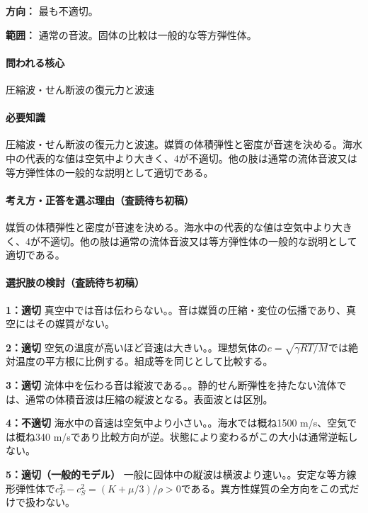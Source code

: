 \noindent\textbf{方向：} 最も不適切。\par

\noindent\textbf{範囲：} 通常の音波。固体の比較は一般的な等方弾性体。\par

\paragraph{問われる核心} 圧縮波・せん断波の復元力と波速

\paragraph{必要知識} 圧縮波・せん断波の復元力と波速。媒質の体積弾性と密度が音速を決める。海水中の代表的な値は空気中より大きく、4が不適切。他の肢は通常の流体音波又は等方弾性体の一般的な説明として適切である。

\paragraph{考え方・正答を選ぶ理由（査読待ち初稿）} 媒質の体積弾性と密度が音速を決める。海水中の代表的な値は空気中より大きく、4が不適切。他の肢は通常の流体音波又は等方弾性体の一般的な説明として適切である。

\paragraph{選択肢の検討（査読待ち初稿）}\mbox{}\par

\noindent\textbf{1：適切} 真空中では音は伝わらない。。音は媒質の圧縮・変位の伝播であり、真空にはその媒質がない。\par

\noindent\textbf{2：適切} 空気の温度が高いほど音速は大きい。。理想気体の\(c=\sqrt{\gamma RT/M}\)では絶対温度の平方根に比例する。組成等を同じとして比較する。\par

\noindent\textbf{3：適切} 流体中を伝わる音は縦波である。。静的せん断弾性を持たない流体では、通常の体積音波は圧縮の縦波となる。表面波とは区別。\par

\noindent\textbf{4：不適切} 海水中の音速は空気中より小さい。。海水では概ね1500 m/s、空気では概ね340 m/sであり比較方向が逆。状態により変わるがこの大小は通常逆転しない。\par

\noindent\textbf{5：適切（一般的モデル）} 一般に固体中の縦波は横波より速い。。安定な等方線形弾性体で\(c_P^2-c_S^2=(K+\mu/3)/\rho>0\)である。異方性媒質の全方向をこの式だけで扱わない。\par


